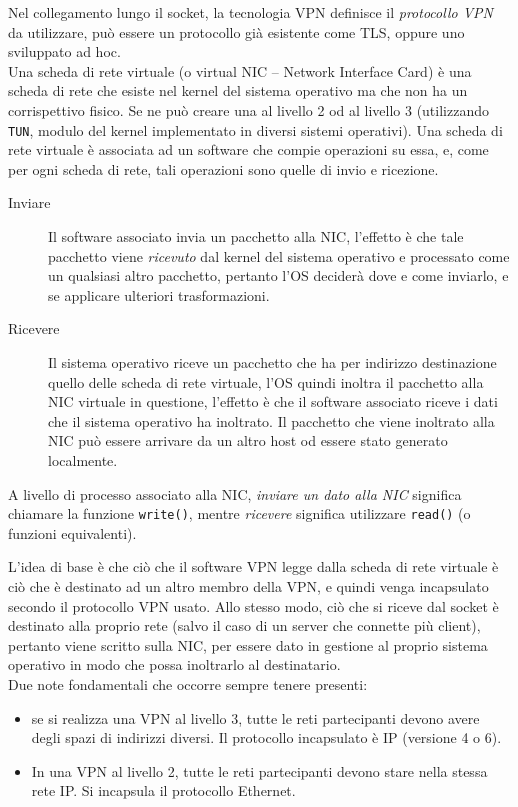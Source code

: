 Nel collegamento lungo il socket, la tecnologia VPN definisce il \textit{protocollo VPN}
da utilizzare, può essere un protocollo già esistente come TLS,
oppure uno sviluppato ad hoc.\\
Una scheda di rete virtuale (o virtual NIC -- Network Interface Card) è una
scheda di rete che esiste nel kernel del sistema
operativo ma che non ha un corrispettivo fisico. Se ne può creare una al livello 2
od al livello 3 (utilizzando \texttt{TUN}, modulo del
kernel implementato in diversi sistemi operativi).
Una scheda di rete virtuale è associata ad un software che compie operazioni su essa,
e, come per ogni scheda di rete, tali operazioni sono quelle di invio e ricezione.
\begin{description}
	\item[Inviare]Il software associato invia un pacchetto alla NIC, l'effetto è che tale
	pacchetto viene \textit{ricevuto} dal kernel del sistema operativo e processato
	come un qualsiasi altro pacchetto, pertanto l'OS deciderà
	dove e come inviarlo, e se applicare ulteriori trasformazioni.
	\item[Ricevere]Il sistema operativo riceve un pacchetto che ha per indirizzo destinazione
	quello delle scheda di rete virtuale, l'OS quindi inoltra il pacchetto alla NIC
	virtuale in questione, l'effetto è che il software associato riceve i dati
	che il sistema operativo ha inoltrato. Il pacchetto che viene inoltrato alla NIC
	può essere arrivare da un altro host od essere stato generato localmente.
\end{description}
A livello di processo associato alla NIC, \textit{inviare un dato alla NIC} significa
chiamare la funzione \texttt{write()}, mentre \textit{ricevere} significa
utilizzare \texttt{read()} (o funzioni equivalenti).


L'idea di base è che ciò che il software VPN legge dalla scheda di rete virtuale
è ciò che è destinato ad un altro membro della VPN, e quindi venga incapsulato secondo
il protocollo VPN usato. Allo stesso modo, ciò che si riceve dal socket è destinato
alla proprio rete (salvo il caso di un server che connette più client), pertanto
viene scritto sulla NIC, per essere dato in gestione al proprio sistema operativo in
modo che possa inoltrarlo al destinatario.\\
Due note fondamentali che occorre sempre tenere presenti:
\begin{itemize}
	\item se si realizza una VPN al livello 3, tutte le reti partecipanti devono
	      avere degli spazi di indirizzi diversi. Il protocollo incapsulato è IP
	      (versione 4 o 6).
	\item In una VPN al livello 2, tutte le reti partecipanti devono stare
	      nella stessa rete IP. Si incapsula il protocollo Ethernet.
\end{itemize}

